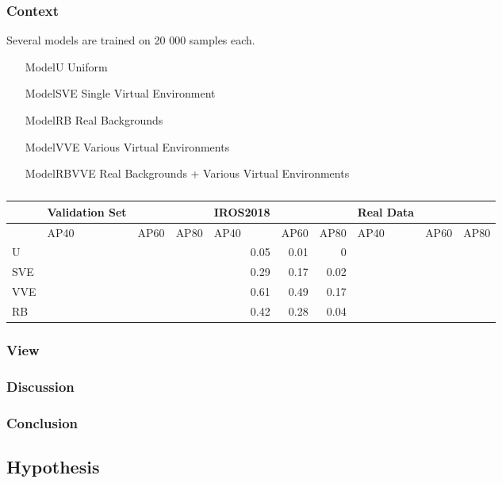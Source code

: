 \subsubsection{Context}

Several models are trained on 20 000 samples each.
\begin{itemize}
	\item[ModelU] Uniform
	\item[ModelSVE] Single Virtual Environment
	\item[ModelRB] Real Backgrounds
	\item[ModelVVE] Various Virtual Environments
	\item[ModelRBVVE] Real Backgrounds + Various Virtual Environments
\end{itemize}


\begin{table}[htbp]
	\caption{}
	\begin{tabular}{|l|l|l|l|r|r|r|l|l|l|}
		\hline
		& Validation Set &  &  & \multicolumn{1}{l|}{IROS2018} & \multicolumn{1}{l|}{} & \multicolumn{1}{l|}{} & Real Data &  &  \\ \hline
		& AP40 & AP60 & AP80 & \multicolumn{1}{l|}{AP40} & \multicolumn{1}{l|}{AP60} & \multicolumn{1}{l|}{AP80} & AP40 & AP60 & AP80 \\ \hline
		U &  &  &  & 0.05 & 0.01 & 0 &  &  &  \\ \hline
		SVE &  &  &  & 0.29 & 0.17 & 0.02 &  &  &  \\ \hline
		VVE &  &  &  & 0.61 & 0.49 & 0.17 &  &  &  \\ \hline
		RB &  &  &  & 0.42 & 0.28 & 0.04 &  &  &  \\ \hline
	\end{tabular}
	\label{tab:env}
\end{table}


\subsubsection{View}


\subsubsection{Discussion}

\subsubsection{Conclusion}


\subsection{Hypothesis}
\label{sec:training:hypothesis}

